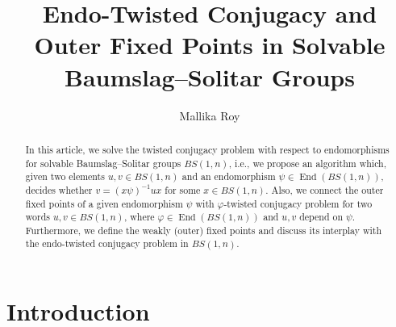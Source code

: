 \documentclass[a4paper]{amsart}
\theoremstyle{definition}
\newcommand{\End}{\operatorname{End}}
\newcounter{mallikacomments}
\newcommand{\mallika}[1]{\textbf{\color{cyan}(R\arabic{mallikacomments})} \marginpar{\tiny\raggedright\textbf{\color{cyan}(R\arabic{mallikacomments})Mallika:} #1}
\addtocounter{mallikacomments}{1}}
\begin{document}

\title{Endo-Twisted Conjugacy and Outer Fixed Points in Solvable Baumslag--Solitar Groups}




\author{Mallika Roy}
\address{Harish-Chandra Research Institute, HBNI, Chhatnag Road, Jhunsi, Prayagraj (Allahabad) 211019, India.} 




\begin{abstract}
In this article, we solve the twisted conjugacy problem with respect to endomorphisms for solvable Baumslag--Solitar groups $BS(1,n)$, i.e., we propose an algorithm which, given two elements $u,v \in BS(1,n)$ and an endomorphism $\psi \in \End(BS(1,n))$, decides whether $v=(x\psi)^{-1} u x$ for some $x\in BS(1,n)$. Also, we connect the outer fixed points of a given endomorphism $\psi$ with $\varphi$-twisted conjugacy problem for two words $u, v \in BS(1,n)$, where $\varphi \in \End(BS(1,n))$ and $u, v$ depend on $\psi$. Furthermore, we define the weakly (outer) fixed points and discuss its interplay with the endo-twisted conjugacy problem in $BS(1, n)$.
\end{abstract}

\maketitle

\section{Introduction}

\end{document}
